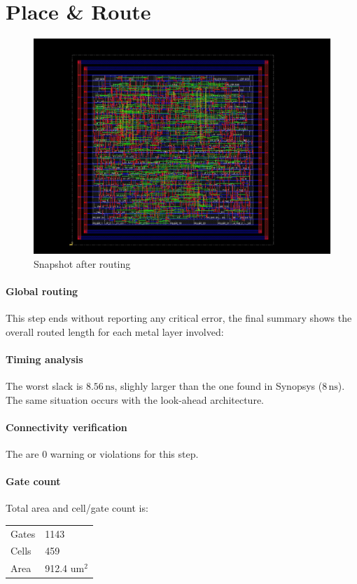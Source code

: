 \section{Place \& Route}
\begin{figure}
		\includegraphics[width=\textwidth]{./chapter5/pic.jpg}
		\caption{Snapshot after routing}
\end{figure}
\paragraph{Global routing} This step ends without reporting any critical error, the final summary shows the overall routed length for each metal layer involved:


\paragraph{Timing analysis} The worst slack is $8.56\,\textrm{ns}$, slighly larger than the one found in Synopsys ($8\,\textrm{ns}$). The same situation occurs with the look-ahead architecture.


\paragraph{Connectivity verification} The are 0 warning or violations for this step.


\paragraph{Gate count} Total area and cell/gate count is:
\begin{center}
    \begin{tabular}{|l|l|}
	   \hline
	   Gates & 1143 \\
	   Cells &     459 \\
	   Area &     912.4 um$^2$\\\hline
    \end{tabular}
\end{center}



